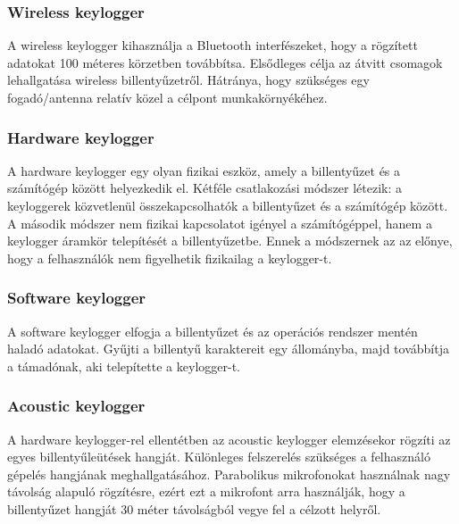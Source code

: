 \documentclass[a4paper, 11pt]{article}
\begin{document}
\subsubsection{Wireless keylogger}
\cite{ahmed2014survey} A wireless keylogger kihasználja a Bluetooth interfészeket, hogy a rögzített adatokat 100 méteres körzetben továbbítsa. Elsődleges célja az átvitt csomagok lehallgatása wireless billentyűzetről. Hátránya, hogy szükséges egy fogadó/antenna relatív közel a célpont munkakörnyékéhez.

\subsubsection{Hardware keylogger}
\cite{ahmed2014survey} A hardware keylogger egy olyan fizikai eszköz, amely a billentyűzet és a számítógép között helyezkedik el. Kétféle csatlakozási módszer létezik: a keyloggerek közvetlenül összekapcsolhatók a billentyűzet és a számítógép között. A második módszer nem fizikai kapcsolatot igényel a számítógéppel, hanem a keylogger áramkör telepítését a billentyűzetbe. Ennek a módszernek az az előnye, hogy a felhasználók nem figyelhetik fizikailag a keylogger-t.

\subsubsection{Software keylogger}
\cite{ahmed2014survey} A software keylogger elfogja a billentyűzet és az operációs rendszer mentén haladó adatokat. Gyűjti a billentyű karaktereit egy állományba, majd továbbítja a támadónak, aki telepítette a keylogger-t.

\subsubsection{Acoustic keylogger}
\cite{ahmed2014survey} A hardware keylogger-rel ellentétben az acoustic keylogger elemzésekor rögzíti az egyes billentyűleütések hangját. Különleges felszerelés szükséges a felhasználó gépelés hangjának meghallgatásához. Parabolikus mikrofonokat használnak nagy távolság alapuló rögzítésre, ezért ezt a mikrofont arra használják, hogy a billentyűzet hangját 30 méter távolságból vegye fel a célzott helyről.
\end{document}
